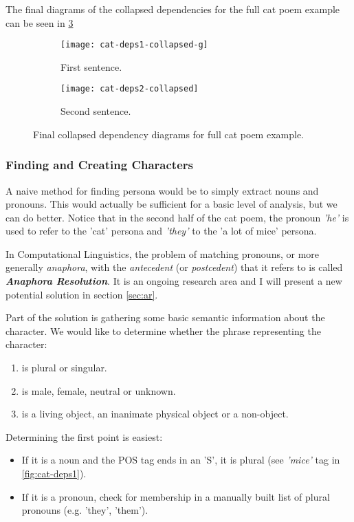 The final diagrams of the collapsed dependencies for the full cat poem example can be seen in \ref{fig:cat-collapsed}

\begin{figure}[H]
\centering
\begin{subfigure}[t]{0.9\textwidth}
	\centering
    \texttt{[image: cat-deps1-collapsed-g]}
    \caption{First sentence.}
    \label{fig:cat-deps1-collapsed-g-final}
\end{subfigure}
\begin{subfigure}[t]{0.9\textwidth}
	\centering
    \texttt{[image: cat-deps2-collapsed]}
    \caption{Second sentence.}
    \label{fig:cat-deps2-collapsed}
\end{subfigure}
\caption{Final collapsed dependency diagrams for full cat poem example.}
\label{fig:cat-collapsed}
\end{figure}

\subsubsection{Finding and Creating Characters}
\label{sec:characters} 

A naive method for finding persona would be to simply extract nouns and pronouns. This would actually be sufficient for a basic level of analysis, but we can do better. Notice that in the second half of the cat poem, the pronoun \textit{'he'} is used to refer to the 'cat' persona and \textit{'they'} to the 'a lot of mice' persona.

In Computational Linguistics, the problem of matching pronouns, or more generally \textit{anaphora}, with the \textit{antecedent} (or \textit{postcedent}) that it refers to is called \textit{\textbf{Anaphora Resolution}}. It is an ongoing research area and I will present a new potential solution in section \ref{sec:ar}.

Part of the solution is gathering some basic semantic information about the character. We would like to determine whether the phrase representing the character:

\begin{enumerate}
\item{is plural or singular.}
\item{is male, female, neutral or unknown.}
\item{is a living object, an inanimate physical object or a non-object.}
\end{enumerate}

Determining the first point is easiest:
\begin{itemize}
\item{If it is a noun and the POS tag ends in an 'S', it is plural (see \textit{'mice'} tag in \ref{fig:cat-deps1}).}
\item{If it is a pronoun, check for membership in a manually built list of plural pronouns (e.g. 'they', 'them').}
\end{itemize}

